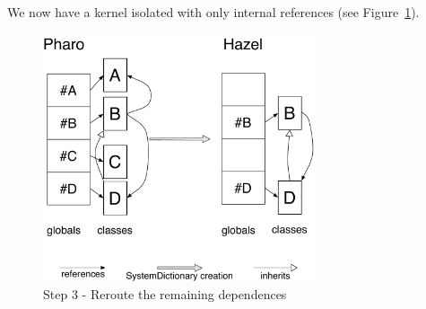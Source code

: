 \inanutshell We now have a kernel isolated with only internal references (see Figure~\ref{RerouteDependencies}).

\begin{figure}[ht]
	\centering\includegraphics[width = 8cm]{figures/selfContainReferenceWIthInh}
	\caption{Step 3 - Reroute the remaining dependences}
	\label{RerouteDependencies}
\end{figure}









